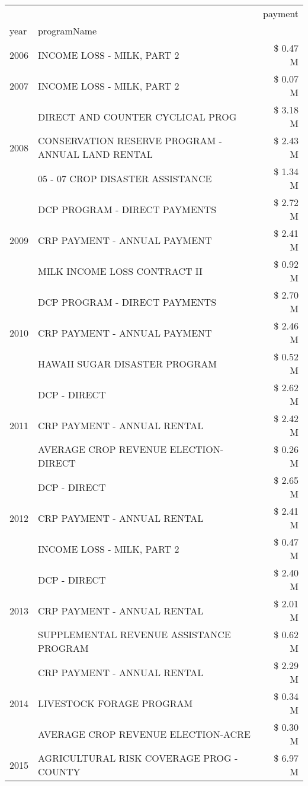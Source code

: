 \begin{tabular}{llr}
\toprule
 &  & payment \\
year & programName &  \\
\midrule
2006 & INCOME LOSS - MILK, PART 2 & \$ 0.47 M \\
\cline{1-3}
2007 & INCOME LOSS - MILK, PART 2 & \$ 0.07 M \\
\cline{1-3}
\multirow[t]{3}{*}{2008} & DIRECT AND COUNTER CYCLICAL PROG & \$ 3.18 M \\
 & CONSERVATION RESERVE PROGRAM - ANNUAL LAND RENTAL & \$ 2.43 M \\
 & 05 - 07 CROP DISASTER ASSISTANCE & \$ 1.34 M \\
\cline{1-3}
\multirow[t]{3}{*}{2009} & DCP PROGRAM - DIRECT PAYMENTS & \$ 2.72 M \\
 & CRP PAYMENT - ANNUAL PAYMENT & \$ 2.41 M \\
 & MILK INCOME LOSS CONTRACT II & \$ 0.92 M \\
\cline{1-3}
\multirow[t]{3}{*}{2010} & DCP PROGRAM - DIRECT PAYMENTS & \$ 2.70 M \\
 & CRP PAYMENT - ANNUAL PAYMENT & \$ 2.46 M \\
 & HAWAII SUGAR DISASTER PROGRAM & \$ 0.52 M \\
\cline{1-3}
\multirow[t]{3}{*}{2011} & DCP - DIRECT & \$ 2.62 M \\
 & CRP PAYMENT - ANNUAL RENTAL & \$ 2.42 M \\
 & AVERAGE CROP REVENUE ELECTION-DIRECT & \$ 0.26 M \\
\cline{1-3}
\multirow[t]{3}{*}{2012} & DCP - DIRECT & \$ 2.65 M \\
 & CRP PAYMENT - ANNUAL RENTAL & \$ 2.41 M \\
 & INCOME LOSS - MILK, PART 2 & \$ 0.47 M \\
\cline{1-3}
\multirow[t]{3}{*}{2013} & DCP - DIRECT & \$ 2.40 M \\
 & CRP PAYMENT - ANNUAL RENTAL & \$ 2.01 M \\
 & SUPPLEMENTAL REVENUE ASSISTANCE PROGRAM & \$ 0.62 M \\
\cline{1-3}
\multirow[t]{3}{*}{2014} & CRP PAYMENT - ANNUAL RENTAL & \$ 2.29 M \\
 & LIVESTOCK FORAGE PROGRAM & \$ 0.34 M \\
 & AVERAGE CROP REVENUE ELECTION-ACRE & \$ 0.30 M \\
\cline{1-3}
\multirow[t]{3}{*}{2015} & AGRICULTURAL RISK COVERAGE PROG - COUNTY & \$ 6.97 M \\

\end{tabular}
